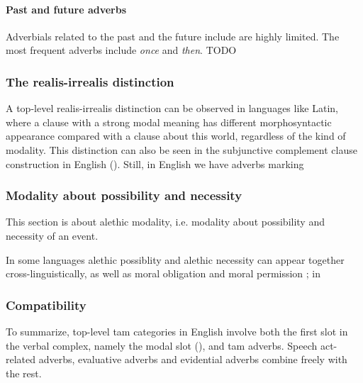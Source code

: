 \documentclass[UTF8, a4paper, oneside, scheme=plain, 12pt]{ctexbook}
\newcommand*{\citepage}[1]{p.~{#1}}
\newcommand{\form}[1]{\emph{#1}}
\begin{document}
\paragraph{Past and future adverbs} 
Adverbials related to the past and the future include are highly limited.
The most frequent adverbs include \form{once} and \form{then}. TODO 

\subsubsection{The realis-irrealis distinction}

A top-level realis-irrealis distinction can be observed in languages like Latin,
where a clause with a strong modal meaning has different morphosyntactic appearance
compared with a clause about this world,
regardless of the kind of modality.
This distinction can also be seen in the 
subjunctive complement clause construction in English
().
Still, in English we have adverbs marking 

\begin{exe}
    \ex 
\end{exe}

\subsubsection{Modality about possibility and necessity}\label{sec:vp.tam.alethic}

This section is about alethic modality, i.e. modality about possibility and necessity of an event.

In some languages alethic possiblity and alethic necessity can appear together cross-linguistically,
as well as moral obligation and moral permission
\citep[\citepage{80}]{cinque1999adverbs};
in 


\begin{exe}
    \ex 
\end{exe}


\subsubsection{Compatibility}

To summarize, top-level \ac{tam} categories in English 
involve both the first slot in the verbal complex,
namely the modal slot
(),
and \ac{tam} adverbs.
Speech act-related adverbs, evaluative adverbs 
and evidential adverbs combine freely with the rest.
\end{document}
